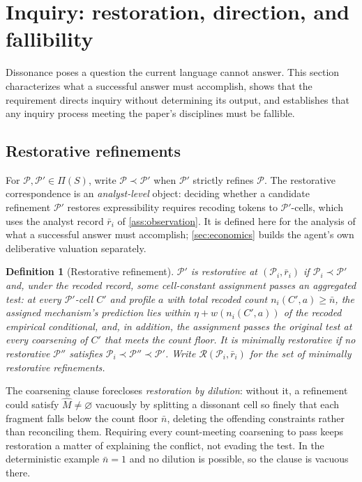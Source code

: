 \documentclass[11pt]{article}
\newtheorem{definition}[assumption]{Definition}
\theoremstyle{definition}
\newcommand{\emptysetset}{\varnothing}
\begin{document}
\section{Inquiry: restoration, direction, and fallibility}
\label{sec:inquiry}

Dissonance poses a question the current language cannot answer.  This
section characterizes what a successful answer must accomplish, shows that
the requirement directs inquiry without determining its output, and
establishes that any inquiry process meeting the paper's disciplines must be
fallible.

\subsection{Restorative refinements}

For $\mathcal P,\mathcal P'\in\Pi(S)$, write $\mathcal P\prec\mathcal P'$
when $\mathcal P'$ strictly refines $\mathcal P$.  The restorative
correspondence is an \emph{analyst-level} object: deciding whether a candidate
refinement $\mathcal P'$ restores expressibility requires recoding tokens to
$\mathcal P'$-cells, which uses the analyst record $\bar r_i$ of
\cref{ass:observation}.  It is defined here for the analysis of what a
successful answer must accomplish; \cref{sec:economics} builds the agent's own
deliberative valuation separately.

\begin{definition}[Restorative refinement]
\label{def:restorative}
$\mathcal P'$ is \emph{restorative} at $(\mathcal P_i,\bar r_i)$ if
$\mathcal P_i\prec\mathcal P'$ and, under the recoded record, some
cell-constant assignment passes an \emph{aggregated} test: at every
$\mathcal P'$-cell $C'$ and profile $a$ with total recoded count
$n_i(C',a)\geq\bar n$, the assigned mechanism's prediction lies within
$\eta+w(n_i(C',a))$ of the recoded empirical conditional, and, in addition,
the assignment passes the original test at every coarsening of $C'$ that meets
the count floor.  It is \emph{minimally restorative} if no restorative
$\mathcal P''$ satisfies $\mathcal P_i\prec\mathcal P''\prec\mathcal P'$.  Write
$\mathcal R(\mathcal P_i,\bar r_i)$ for the set of minimally restorative
refinements.
\end{definition}

The coarsening clause forecloses \emph{restoration by dilution}: without it, a
refinement could satisfy $\widehat M\neq\emptysetset$ vacuously by splitting a
dissonant cell so finely that each fragment falls below the count floor
$\bar n$, deleting the offending constraints rather than reconciling them.
Requiring every count-meeting coarsening to pass keeps restoration a matter of
explaining the conflict, not evading the test.  In the deterministic example
$\bar n=1$ and no dilution is possible, so the clause is vacuous there.
\end{document}
